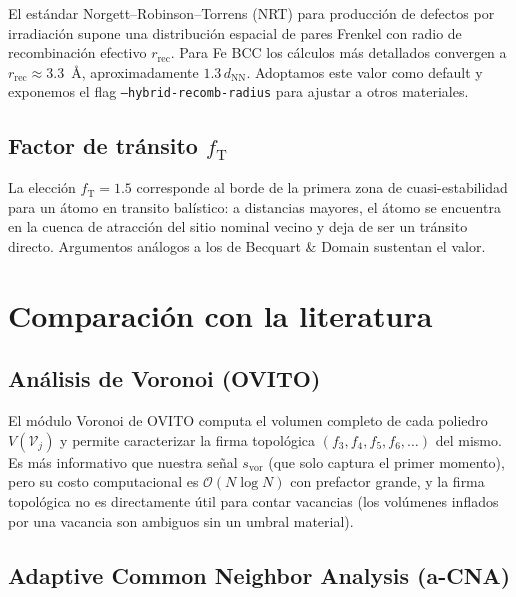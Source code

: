 \documentclass[11pt,a4paper]{article}
\theoremstyle{remark}
\begin{document}
El estándar Norgett--Robinson--Torrens (NRT) \cite{Norgett1975} para
producción de defectos por irradiación supone una distribución
espacial de pares Frenkel con radio de recombinación efectivo
$r_\text{rec}$. Para Fe BCC los cálculos más detallados
\cite{Bjorkas2009,Becquart2010} convergen a
$r_\text{rec} \approx 3.3$~Å, aproximadamente $1.3\,d_\text{NN}$.
Adoptamos este valor como default y exponemos el flag
\texttt{--hybrid-recomb-radius} para ajustar a otros materiales.

\subsection{Factor de tránsito $f_\text{T}$}

La elección $f_\text{T} = 1.5$ corresponde al borde de la primera
zona de cuasi-estabilidad para un átomo en transito balístico: a
distancias mayores, el átomo se encuentra en la cuenca de atracción
del sitio nominal vecino y deja de ser un tránsito directo.
Argumentos análogos a los de
Becquart \& Domain \cite{Becquart2010} sustentan el valor.

\section{Comparación con la literatura}

\subsection{Análisis de Voronoi (OVITO)}

El módulo Voronoi de OVITO \cite{Stukowski2010Ovito} computa el
volumen completo de cada poliedro $V(\mathcal{V}_j)$ y permite
caracterizar la firma topológica $(f_3, f_4, f_5, f_6, \ldots)$ del
mismo. Es más informativo que nuestra señal $s_\text{vor}$ (que solo
captura el primer momento), pero su costo computacional es
$\mathcal{O}(N \log N)$ con prefactor grande, y la firma topológica
no es directamente útil para contar vacancias (los volúmenes
inflados por una vacancia son ambiguos sin un umbral material).

\subsection{Adaptive Common Neighbor Analysis (a-CNA)}
\end{document}
